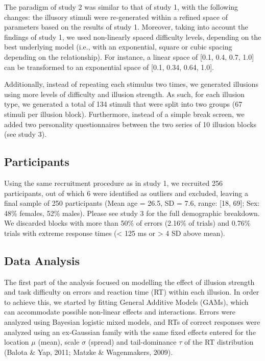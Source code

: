 \documentclass[
  man,floatsintext]{apa6}
\begin{document}
The paradigm of study 2 was similar to that of study 1, with the following changes: the illusory stimuli were re-generated within a refined space of parameters based on the results of study 1. Moreover, taking into account the findings of study 1, we used non-linearly spaced difficulty levels, depending on the best underlying model (i.e., with an exponential, square or cubic spacing depending on the relationship). For instance, a linear space of {[}0.1, 0.4, 0.7, 1.0{]} can be transformed to an exponential space of {[}0.1, 0.34, 0.64, 1.0{]}.

Additionally, instead of repeating each stimulus two times, we generated illusions using more levels of difficulty and illusion strength. As such, for each illusion type, we generated a total of 134 stimuli that were split into two groups (67 stimuli per illusion block). Furthermore, instead of a simple break screen, we added two personality questionnaires between the two series of 10 illusion blocks (see study 3).

\hypertarget{participants-1}{%
\subsection{Participants}\label{participants-1}}

Using the same recruitment procedure as in study 1, we recruited 256 participants, out of which 6 were identified as outliers and excluded, leaving a final sample of 250 participants (Mean age = 26.5, SD = 7.6, range: {[}18, 69{]}; Sex: 48\% females, 52\% males). Please see study 3 for the full demographic breakdown. We discarded blocks with more than 50\% of errors (2.16\% of trials) and 0.76\% trials with extreme response times (\textless{} 125 ms or \textgreater{} 4 SD above mean).

\hypertarget{data-analysis-1}{%
\subsection{Data Analysis}\label{data-analysis-1}}

The first part of the analysis focused on modelling the effect of illusion strength and task difficulty on errors and reaction time (RT) within each illusion. In order to achieve this, we started by fitting General Additive Models (GAMs), which can accommodate possible non-linear effects and interactions. Errors were analyzed using Bayesian logistic mixed models, and RTs of correct responses were analyzed using an ex-Gaussian family with the same fixed effects entered for the location \(\mu\) (mean), scale \(\sigma\) (spread) and tail-dominance \(\tau\) of the RT distribution (Balota \& Yap, 2011; Matzke \& Wagenmakers, 2009).
\end{document}
